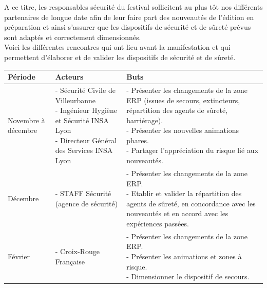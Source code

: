\documentclass[hidelinks, paper=a4, fontsize=13pt]{report}
\begin{document}
A ce titre, les responsables sécurité du festival sollicitent au plus tôt nos différents partenaires de longue date afin de leur faire part des nouveautés de l’édition en préparation et ainsi s’assurer que les dispositifs de sécurité et de sûreté prévus sont adaptés et correctement dimensionnés.\\

Voici les différentes rencontres qui ont lieu avant la manifestation et qui permettent d'élaborer et de valider les dispositifs de sécurité et de sûreté.\\

\begin{center}
\begin{tabular}{| p{2cm} | p{5.5cm} | p{8cm} |}
\shrinkheight{1cm} 

  \hline
  \cellcolor[gray]{0.9} \textbf{Période} & \cellcolor[gray]{0.9} \textbf{Acteurs} & \cellcolor[gray]{0.9} \textbf{Buts} \\
  \hline
\vspace{0.1cm}
  Novembre à décembre & 
  \parbox[t]{5.5cm}{- Sécurité Civile de Villeurbanne\\
  - Ingénieur Hygiène et Sécurité INSA Lyon\\
  - Directeur Général des Services INSA Lyon} & 
  \parbox[t]{8cm}{- Présenter les changements de la zone ERP (issues de secours, extincteurs, répartition des agents de sûreté, barriérage).\\
  - Présenter les nouvelles animations phares.\\
  - Partager l'appréciation du risque lié aux nouveautés.}
\vspace{0.1cm}
 \\
 \hline
\vspace{0.1cm}
  Décembre &
  \parbox[t]{5.5cm}{- STAFF Sécurité (agence de sécurité)} & 
  \parbox[t]{8cm}{- Présenter les changements de la zone ERP.\\
  - Etablir et valider la répartition des agents de sûreté, en concordance avec les nouveautés et en accord avec les expériences passées.}
\vspace{0.1cm}
 \\
 \hline
\vspace{0.1cm}
  Février &
  \parbox[t]{5.5cm}{- Croix-Rouge Française} & 
  \parbox[t]{8cm}{- Présenter les changements de la zone ERP.\\
  - Présenter les animations et zones à risque.\\
  - Dimensionner le dispositif de secours.}
\vspace{0.1cm}

\end{tabular}
\end{center}
\end{document}
